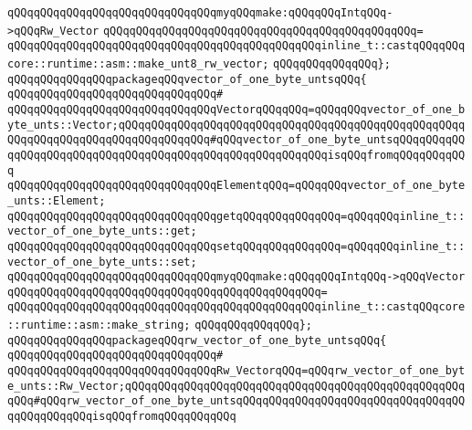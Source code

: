 \newline
\verb|qQQqqQQqqQQqqQQqqQQqqQQqqQQqqQQqmyqQQqmake:qQQqqQQqIntqQQq->qQQqRw_Vector|\newline
\verb|qQQqqQQqqQQqqQQqqQQqqQQqqQQqqQQqqQQqqQQqqQQqqQQq=|\newline
\verb|qQQqqQQqqQQqqQQqqQQqqQQqqQQqqQQqqQQqqQQqqQQqqQQqinline_t::castqQQqqQQqcore::runtime::asm::make_unt8_rw_vector;|\newline
\verb|qQQqqQQqqQQqqQQq};|\newline
\newline
\verb|qQQqqQQqqQQqqQQqpackageqQQqvector_of_one_byte_untsqQQq{|\newline
\verb|qQQqqQQqqQQqqQQqqQQqqQQqqQQqqQQq#|\newline
\verb|qQQqqQQqqQQqqQQqqQQqqQQqqQQqqQQqVectorqQQqqQQq=qQQqqQQqvector_of_one_byte_unts::Vector;qQQqqQQqqQQqqQQqqQQqqQQqqQQqqQQqqQQqqQQqqQQqqQQqqQQqqQQqqQQqqQQqqQQqqQQqqQQqqQQqqQQq#qQQqvector_of_one_byte_untsqQQqqQQqqQQqqQQqqQQqqQQqqQQqqQQqqQQqqQQqqQQqqQQqqQQqqQQqqQQqisqQQqfromqQQqqQQqqQQq|\newline
\verb|qQQqqQQqqQQqqQQqqQQqqQQqqQQqqQQqElementqQQq=qQQqqQQqvector_of_one_byte_unts::Element;|\newline
\newline
\verb|qQQqqQQqqQQqqQQqqQQqqQQqqQQqqQQqgetqQQqqQQqqQQqqQQq=qQQqqQQqinline_t::vector_of_one_byte_unts::get;|\newline
\verb|qQQqqQQqqQQqqQQqqQQqqQQqqQQqqQQqsetqQQqqQQqqQQqqQQq=qQQqqQQqinline_t::vector_of_one_byte_unts::set;|\newline
\newline
\verb|qQQqqQQqqQQqqQQqqQQqqQQqqQQqqQQqmyqQQqmake:qQQqqQQqIntqQQq->qQQqVector|\newline
\verb|qQQqqQQqqQQqqQQqqQQqqQQqqQQqqQQqqQQqqQQqqQQqqQQq=|\newline
\verb|qQQqqQQqqQQqqQQqqQQqqQQqqQQqqQQqqQQqqQQqqQQqqQQqinline_t::castqQQqcore::runtime::asm::make_string;|\newline
\verb|qQQqqQQqqQQqqQQq};|\newline
\newline
\verb|qQQqqQQqqQQqqQQqpackageqQQqrw_vector_of_one_byte_untsqQQq{|\newline
\verb|qQQqqQQqqQQqqQQqqQQqqQQqqQQqqQQq#|\newline
\verb|qQQqqQQqqQQqqQQqqQQqqQQqqQQqqQQqRw_VectorqQQq=qQQqrw_vector_of_one_byte_unts::Rw_Vector;qQQqqQQqqQQqqQQqqQQqqQQqqQQqqQQqqQQqqQQqqQQqqQQqqQQqqQQq#qQQqrw_vector_of_one_byte_untsqQQqqQQqqQQqqQQqqQQqqQQqqQQqqQQqqQQqqQQqqQQqqQQqisqQQqfromqQQqqQQqqQQq|\newline
